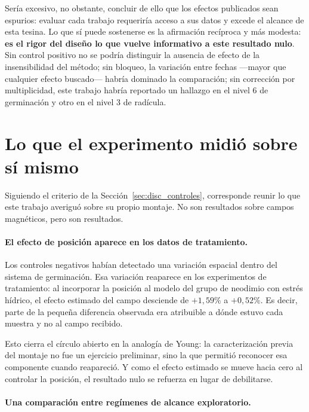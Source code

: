 Sería excesivo, no obstante, concluir de ello que los efectos publicados sean espurios: evaluar cada trabajo requeriría acceso a sus datos y excede el alcance de esta tesina. Lo que sí puede sostenerse es la afirmación recíproca y más modesta: \textbf{es el rigor del diseño lo que vuelve informativo a este resultado nulo}. Sin control positivo no se podría distinguir la ausencia de efecto de la insensibilidad del método; sin bloqueo, la variación entre fechas ---mayor que cualquier efecto buscado--- habría dominado la comparación; sin corrección por multiplicidad, este trabajo habría reportado un hallazgo en el nivel 6 de germinación y otro en el nivel 3 de radícula.

\section{Lo que el experimento midió sobre sí mismo}
\label{sec:disc_aparato}

Siguiendo el criterio de la Sección~\ref{sec:disc_controles}, corresponde reunir lo que este trabajo averiguó sobre su propio montaje. No son resultados sobre campos magnéticos, pero son resultados.

\paragraph{El efecto de posición aparece en los datos de tratamiento.}

Los controles negativos habían detectado una variación espacial dentro del sistema de germinación. Esa variación reaparece en los experimentos de tratamiento: al incorporar la posición al modelo del grupo de neodimio con estrés hídrico, el efecto estimado del campo desciende de \(+1{,}59\%\) a \(+0{,}52\%\). Es decir, parte de la pequeña diferencia observada era atribuible a dónde estuvo cada muestra y no al campo recibido.

Esto cierra el círculo abierto en la analogía de Young: la caracterización previa del montaje no fue un ejercicio preliminar, sino la que permitió reconocer esa componente cuando reapareció. Y como el efecto estimado se mueve hacia cero al controlar la posición, el resultado nulo se refuerza en lugar de debilitarse.

\paragraph{Una comparación entre regímenes de alcance exploratorio.}

